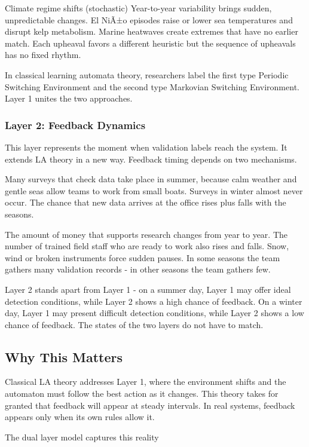 \documentclass[11pt,a4paper]{article}
\begin{document}
Climate regime shifts (stochastic)
Year-to-year variability brings sudden, unpredictable changes. El NiÃ±o episodes raise or lower sea temperatures and disrupt kelp metabolism. Marine heatwaves create extremes that have no earlier match. Each upheaval favors a different heuristic but the sequence of upheavals has no fixed rhythm.

In classical learning automata theory, researchers label the first type Periodic Switching Environment and the second type Markovian Switching Environment. Layer 1 unites the two approaches.

\subsubsection{Layer 2: Feedback Dynamics}

This layer represents the moment when validation labels reach the system. It extends LA theory in a new way. Feedback timing depends on two mechanisms.

Many surveys that check data take place in summer, because calm weather and gentle seas allow teams to work from small boats. Surveys in winter almost never occur. The chance that new data arrives at the office rises plus falls with the seasons.

The amount of money that supports research changes from year to year. The number of trained field staff who are ready to work also rises and falls. Snow, wind or broken instruments force sudden pauses. In some seasons the team gathers many validation records - in other seasons the team gathers few.

Layer 2 stands apart from Layer 1 - on a summer day, Layer 1 may offer ideal detection conditions, while Layer 2 shows a high chance of feedback. On a winter day, Layer 1 may present difficult detection conditions, while Layer 2 shows a low chance of feedback. The states of the two layers do not have to match.

\subsection{Why This Matters}

Classical LA theory addresses Layer 1, where the environment shifts and the automaton must follow the best action as it changes. This theory takes for granted that feedback will appear at steady intervals. In real systems, feedback appears only when its own rules allow it.

The dual layer model captures this reality
\end{document}
